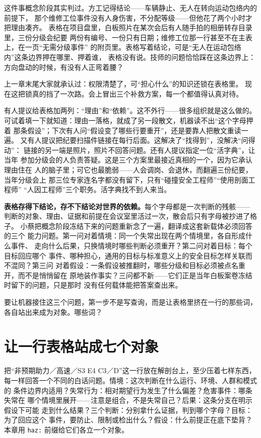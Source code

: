 这件事概念阶段其实判过。方工记得结论——车辆静止、无人在转向运动包络内的前提下，
那个维修工位事件没有人身伤害，不分配等级——但他花了两个小时才把理由凑齐。
表格在项目盘里，白板照片在某次会后有人随手拍的相册转存目录里，三份分级会纪要
两份有编号、一份只有日期；维修工位那一行甚至不在主表上，在一页“无需分级事件”
的附页里。表格写着结论，可是“无人在运动包络内”这条边界押在哪里、押着谁，
表格没有说。技师的问题恰恰踩在这条边界上：方向盘动的时候，有没有人正弯着腰？

上一章末尾大家就承认过：权限清楚了，可“担心什么”的知识还锁在表格里。
现在这把锁真的挡了一次路。会上冒出三个补救方案，每一个都值得认真对待。

有人提议给表格加两列：“理由”和“依赖”。这不外行——很多组织就是这么做的。
可试着填一下就知道：理由一落格，就成了另一段散文，机器读不出“这个字母押着
那条假设”；下次有人问“假设变了哪些行要重开”，还是要靠人把散文重读一遍。
又有人提议把纪要扫描件链接在每行后面。这解决了“找得到”，没解决“问得动”：
链接的另一端是照片，照片不回答问题。还有人提议指定一位“活字典”，让当年
参加分级会的人负责答疑。这是三个方案里最接近真相的一个，因为它承认理由住在
人的脑子里；可它也最脆弱——人会调岗、会退休，而翻遍三份纪要，当年分级会上
那三位专家连名字都没有留下，只有“碰撞安全工程师”“使用剖面工程师”
“人因工程师”三个职务。活字典找不到人来当。

\textbf{表格存得下结论，存不下结论对世界的依赖。}每个字母都是一次判断的残骸——
判断的对象、理由、证据和前提在会议室里活过一次，散会后只有字母被抄进了格子。
小蔡把概念阶段冻结下来的问题重新念了一遍，翻译成这套新载体必须回答的三个
能力问题。第一问对着情境：同一个失常出现在两个情境里，各自形成什么事件、
走向什么后果，只换情境时哪些判断必须重开？第二问对着目标：每个目标回应哪个
事件、哪种担心，通用的目标与标准意义上的安全目标怎样关联而不混同？第三问
对着假设：一条假设被推翻时，哪些分级和目标必须被点名重开，而不是悄悄留在
原地装作事实？三问都不新——它们正是当年白板案卷冻结时留下的问题，只是那时
没有任何载体能把答案查出来。

要让机器接住这三个问题，第一步不是写查询，而是让表格里挤在一行的那些词，
各自站出来成为对象。哪些词？

\section{让一行表格站成七个对象}

把“非预期助力／高速／S3 E4 C3／D”这一行放在解剖台上，至少压着七样东西，
每一样回答一个不同的白话问题。情境：这次判断在什么运行、环境、人群和模式的
条件边界内适用？失常行为：相对期望行为发生了什么偏差？危害事件：哪条失常在
哪个情境里展开——注意是组合，不是失常自己？后果：这条分支在明示假设下可能
走到什么结果？三个判断：分别拿什么证据，判到哪个字母？目标：为了回应这个
事件，要防止、限制或检出什么？假设：什么前提正在底下垫背？本章用 \nolinkurl{haz:}
前缀给它们各立一个对象。

